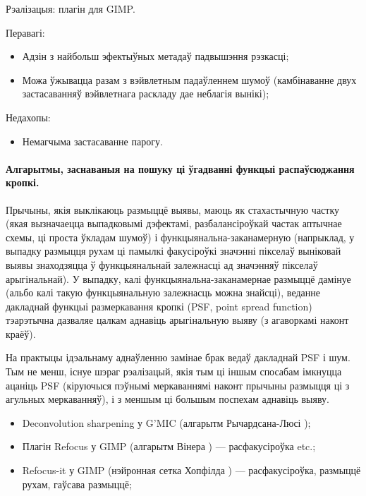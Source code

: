 \documentclass[10pt, a5paper]{article}
\begin{document}
Рэалізацыя: плагін для GIMP.

Перавагі:

\begin{itemize}
  \item Адзін з найбольш эфектыўных метадаў падвышэння рэзкасці;
  \item Можа ўжывацца разам з вэйвлетным падаўленнем шумоў (камбінаванне двух застасаванняў вэйвлетнага раскладу дае неблагія вынікі);
\end{itemize}

Недахопы:

\begin{itemize}
  \item Немагчыма застасаванне парогу.
\end{itemize}

\paragraph*{Алгарытмы, заснаваныя на пошуку ці ўгадванні функцыі распаўсюджання кропкі.}

Прычыны, якія выклікаюць размыццё выявы, маюць як стахастычную частку (якая вызначаецца выпадковымі дэфектамі, разбалансіроўкай частак аптычнае схемы, ці проста ўкладам шумоў) і функцыянальна-заканамерную (напрыклад, у выпадку размыцця рухам ці памылкі факусіроўкі значэнні пікселаў выніковай выявы знаходзяцца ў функцыянальнай залежнасці ад значэнняў пікселаў арыгінальнай). У выпадку, калі функцыянальна-заканамернае размыццё дамінуе (альбо калі такую функцыянальную залежнасць можна знайсці), веданне дакладнай функцыі размеркавання кропкі (PSF, point spread function) тэарэтычна дазваляе цалкам аднавіць арыгінальную выяву (з агаворкамі наконт краёў).

На практыцы ідэальнаму аднаўленню замінае брак ведаў дакладнай PSF і шум. Тым не менш, існуе шэраг рэалізацый, якія тым ці іншым спосабам імкнуцца ацаніць PSF (кіруючыся пэўнымі меркаваннямі наконт прычыны размыцця ці з агульных меркаванняў), і з меншым ці большым поспехам аднавіць выяву.

\begin{itemize}
  \item Deconvolution sharpening у {G'MIC} (алгарытм Рычардсана-Люсі \cite{litv2});
  \item Плагін Refocus у {GIMP} (алгарытм Вінера \cite{litv3}) — расфакусіроўка etc.;
  \item Refocus-it у {GIMP} (нэйронная сетка Хопфілда \cite{litv4}) — расфакусіроўка, размыццё рухам, гаўсава размыццё;
\end{itemize}
\end{document}
